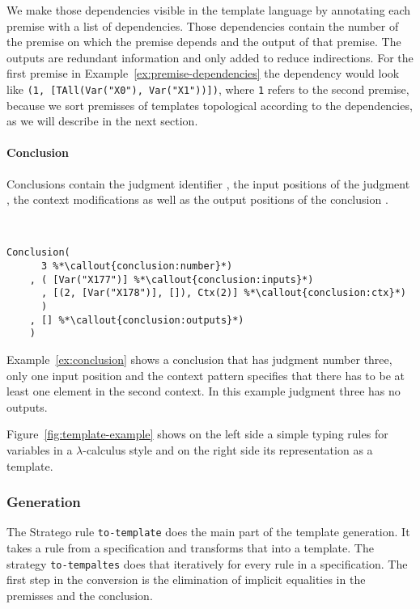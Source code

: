 We make those dependencies visible in the template language by
annotating each premise with a list of dependencies. Those
dependencies contain the number of the premise on which the premise
depends and the output of that premise. The outputs are redundant
information and only added to reduce indirections.
For the first premise in Example~\ref{ex:premise-dependencies} the
dependency would look like
\verb|(1, [TAll(Var("X0"), Var("X1"))])|, where \verb|1| refers to
the second premise, because we sort premisses of templates topological
according to the dependencies, as we will describe in the next
section.

\paragraph{Conclusion}
Conclusions contain the judgment identifier
, the input positions of the judgment
, the context modifications
 as well as the output positions of the
conclusion .

\begin{example}{~}
\begin{lstlisting}[language=sltc]
Conclusion(
      3 %*\callout{conclusion:number}*)
    , ( [Var("X177")] %*\callout{conclusion:inputs}*)
      , [(2, [Var("X178")], []), Ctx(2)] %*\callout{conclusion:ctx}*)
      )
    , [] %*\callout{conclusion:outputs}*)
    )
\end{lstlisting}
\label{ex:conclusion}
\end{example}

Example~\ref{ex:conclusion} shows a conclusion that has judgment
number three, only one input position and the context pattern
specifies that there has to be at least one element in the second
context. In this example judgment three has no outputs.

Figure~\ref{fig:template-example} shows on the left side a simple
typing rules for variables in a $\lambda$-calculus style and on the
right side its representation as a template.

\subsubsection{Generation}
The Stratego rule \verb|to-template| does the main part of the
template generation. It takes a rule from a specification and
transforms that into a template. The strategy \verb|to-tempaltes| does
that iteratively for every rule in a specification. The first step in
the conversion is the elimination of implicit equalities in the
premisses and the conclusion.

